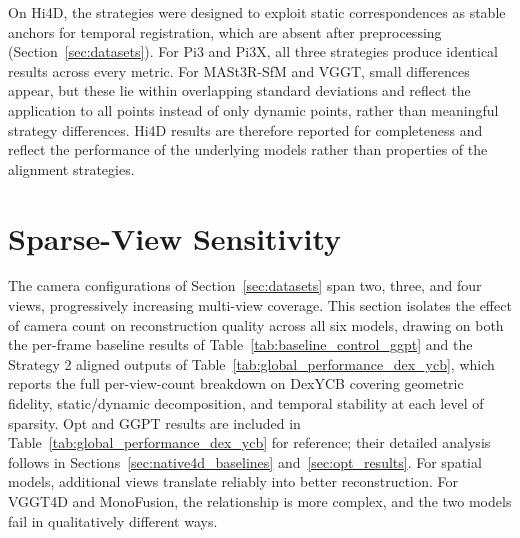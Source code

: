 On Hi4D, the strategies were designed to exploit static correspondences as 
stable anchors for temporal registration, which are absent after preprocessing 
(Section~\ref{sec:datasets}). For Pi3 and Pi3X, all three strategies produce 
identical results across every metric. For MASt3R-SfM and VGGT, small 
differences appear, but these lie within overlapping standard deviations and 
reflect the application to all points instead of only dynamic points, rather than meaningful strategy 
differences. Hi4D results are therefore reported for completeness and reflect 
the performance of the underlying models rather than properties of the 
alignment strategies.

\section{Sparse-View Sensitivity}
\label{sec:sparse_view}

The camera configurations of Section~\ref{sec:datasets} span two, three, and
four views, progressively increasing multi-view coverage. This section isolates
the effect of camera count on reconstruction quality across all six models,
drawing on both the per-frame baseline results of
Table~\ref{tab:baseline_control_ggpt} and the Strategy 2 aligned outputs of
Table~\ref{tab:global_performance_dex_ycb}, which reports the full
per-view-count breakdown on DexYCB covering geometric fidelity,
static/dynamic decomposition, and temporal stability at each level of
sparsity. Opt and GGPT results are included in
Table~\ref{tab:global_performance_dex_ycb} for reference; their detailed
analysis follows in Sections~\ref{sec:native4d_baselines}
and~\ref{sec:opt_results}. For spatial models, additional views translate
reliably into better reconstruction. For VGGT4D and MonoFusion, the
relationship is more complex, and the two models fail in qualitatively
different ways.

